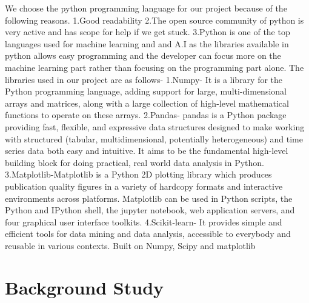 \documentclass{report}
\begin{document}
We choose the python programming language for our project because of the following reasons. \newline
\newline
1.Good readability \newline \newline
2.The open source community of python is very active and has scope for help if we get stuck.\newline \newline
3.Python is one of the top languages used for machine learning and and A.I as the libraries available
in python allows easy programming and the developer can focus more on the machine learning part rather than
focusing on the programming part alone.\newline \newline
The libraries used in our project are as follows- \newline \newline
1.Numpy- It is a library for the Python programming language, adding support for large, multi-dimensional arrays and matrices, along with a large collection of high-level mathematical functions to operate on these arrays.\newline
\newline \newline
2.Pandas- pandas is a Python package providing fast, flexible, and expressive data structures designed to make working with structured (tabular, multidimensional, potentially heterogeneous) and time series data both easy and intuitive. It aims to be the fundamental high-level building block for doing practical, real world data analysis in Python.\newline
\newline \newline
3.Matplotlib-Matplotlib is a Python 2D plotting library which produces publication quality figures in a variety of hardcopy formats and interactive environments across platforms. Matplotlib can be used in Python scripts, the Python and IPython shell, the jupyter notebook, web application servers, and four graphical user interface toolkits.\newline
\newline \newline
4.Scikit-learn- It provides simple and efficient tools for data mining and data analysis, accessible to everybody and
reusable in various contexts. Built on Numpy, Scipy and matplotlib
\newpage
\chapter{Background Study}
\end{document}
